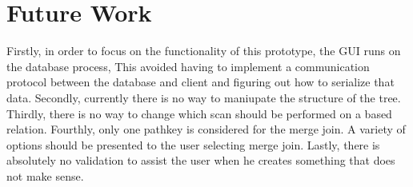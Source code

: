 \documentclass[letterpaper,10pt]{article}
\begin{document}
\section{Future Work}
Firstly, in order to focus on the functionality of this prototype, the GUI runs
on the database process, This avoided having to implement a communication
protocol between the database and client and figuring out how to serialize that
data. Secondly, currently there is no way to maniupate the structure of the
tree. Thirdly, there is no way to change which scan should be performed on a
based relation. Fourthly, only one pathkey is considered for the merge join. A
variety of options should be presented to the user selecting merge join. Lastly,
there is absolutely no validation to assist the user when he creates something
that does not make sense.

\nocite{*}               

     
\end{document}
